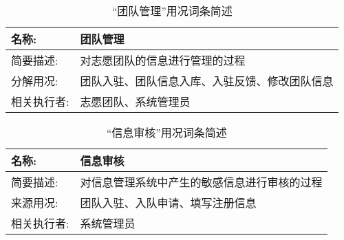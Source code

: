 \begin{table}[H]  
\caption{“团队管理”用况词条简述}  
\begin{center}  
    \begin{tabular}{l p{11cm}} 
        \hline
        \quad 名称:  & 团队管理 \\
        \hline
        \quad 简要描述:  & 对志愿团队的信息进行管理的过程 \\
        \hline
        \quad 分解用况:  & 团队入驻、团队信息入库、入驻反馈、修改团队信息 \\
        \hline
        \quad 相关执行者:  & 志愿团队、系统管理员 \\
        \hline
    \end{tabular}
    \label{tab1}
\end{center}
\end{table}

\begin{table}[H]  
\caption{“信息审核”用况词条简述}  
\begin{center}  
    \begin{tabular}{l p{11cm}} 
        \hline
        \quad 名称:  & 信息审核 \\
        \hline
        \quad 简要描述:  & 对信息管理系统中产生的敏感信息进行审核的过程 \\
        \hline
        \quad 来源用况:  & 团队入驻、入队申请、填写注册信息 \\
        \hline
        \quad 相关执行者:  & 系统管理员 \\
        \hline
    \end{tabular}
    \label{tab1}
\end{center}
\end{table}